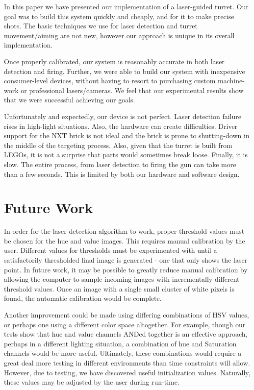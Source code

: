 \documentclass[10pt,twocolumn,letterpaper]{article}
\begin{document}
In this paper we have presented our implementation of a laser-guided turret.  Our goal was to build this system quickly and cheaply, and for it to make precise shots.  The basic techniques we use for laser detection and turret movement/aiming are not new, however our approach is unique in its overall implementation.

Once properly calibrated, our system is reasonably accurate in both laser detection and firing.  Further, we were able to build our system with inexpensive consumer-level devices, without having to resort to purchasing custom machine-work or professional lasers/cameras.  We feel that our experimental results show that we were successful achieving our goals.

Unfortunately and expectedly, our device is not perfect.  Laser detection failure rises in high-light situations.  Also, the hardware can create difficulties.  Driver support for the NXT brick is not ideal and the brick is prone to shutting-down in the middle of the targeting process.  Also, given that the turret is built from LEGOs, it is not a surprise that parts would sometimes break loose.  Finally, it is slow.  The entire process, from laser detection to firing the gun can take more than a few seconds.  This is limited by both our hardware and software design.  

\section{Future Work}

In order for the laser-detection algorithm to work, proper threshold values must be chosen for the hue and value images.  This requires manual calibration by the user.  Different values for thresholds must be experimented with until a satisfactorily thresholded final image is generated - one that only shows the laser point.  In future work, it may be possible to greatly reduce manual calibration by allowing the computer to sample incoming images with incrementally different threshold values.  Once an image with a single small cluster of white pixels is found, the automatic calibration would be complete.

Another improvement could be made using differing combinations of HSV values, or perhaps one using a different color space altogether.  For example, though our tests show that hue and value channels ANDed together is an effective approach, perhaps in a different lighting situation, a combination of hue and Saturation channels would be more useful.  Ultimately, these combinations would require a great deal more testing in different environments than time constraints will allow.  However, due to testing, we have discovered useful initialization values.  Naturally, these values may be adjusted by the user during run-time.
\end{document}
